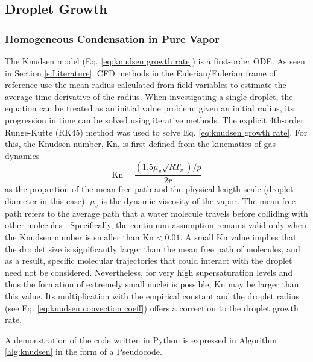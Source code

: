 \documentclass[12pt]{article}
\numberwithin{equation}{section}
\begin{document}
\subsection{Droplet Growth}\label{ss:Methodology-Droplet Growth}
\subsubsection{Homogeneous Condensation in Pure Vapor}\label{sss:Methodology-Droplet-pure}
The Knudsen model (Eq. \ref{eq:knudsen growth rate}) is a first-order ODE. As seen in Section \ref{s:Literature}, CFD methods in the Eulerian/Eulerian frame of reference use the mean radius calculated from field variables to estimate the average time derivative of the radius. When investigating a single droplet, the equation can be treated as an initial value problem: given an initial radius, its progression in time can be solved using iterative methods. The explicit 4th-order Runge-Kutte (RK45) method was used to solve Eq. \ref{eq:knudsen growth rate}. For this, the Knudsen number, \textrm{Kn}, is first defined from the kinematics of gas dynamics \cite{gyarmathy1962grundlagen}
\begin{equation}
    \textrm{Kn}=\frac{(1.5\mu_{v}\sqrt{RT_{v}})/p}{2r}
\end{equation}   
as the proportion of the mean free path and the physical length scale (droplet diameter in this case). $\mu_{v}$ is the dynamic viscosity of the vapor. The mean free path refers to the average path that a water molecule travels before colliding with other molecules \cite{gyarmathy1962grundlagen}. Specifically, the continuum assumption remains valid only when the Knudsen number is smaller than $\textrm{Kn}<0.01$. A small \textrm{Kn} value implies that the droplet size is significantly larger than the mean free path of molecules, and as a result, specific molecular trajectories that could interact with the droplet need not be considered. Nevertheless, for very high supersaturation levels and thus the formation of extremely small nuclei is possible, $\mathrm{Kn}$ may be larger than this value. Its multiplication with the empirical constant and the droplet radius (see Eq. \ref{eq:knudsen convection coeff}) offers a correction to the droplet growth rate.

A demonstration of the code written in Python is expressed in Algorithm \ref{alg:knudsen} in the form of a Pseudocode.
\end{document}
